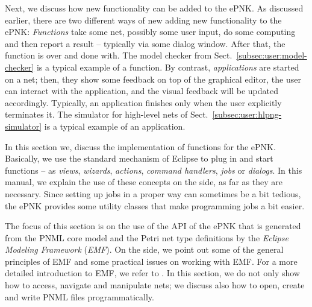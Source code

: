 Next, we discuss how new functionality can be added to the ePNK. As discussed
earlier, there are two different ways of new adding new functionality to the
ePNK: \emph{Functions} take some net, possibly some user input, do some computing
and then report a result -- typically via some dialog window. After that, the function
is over and done with. The model checker from
Sect.~\ref{subsec:user:model-checker} is a typical example of a function.
By contrast, \emph{applications}%
are started on a net; then, they show some feedback on top of the graphical
editor, the user can interact with the application, and the visual feedback
will be updated accordingly. Typically, an application finishes only
when the user explicitly terminates it. The simulator for high-level nets
of Sect.~\ref{subsec:user:hlpng-simulator} is a typical example
of an application.

In this section we, discuss the implementation of functions for the
ePNK. Basically, we use the standard mechanism of Eclipse to plug in
and start functions -- as \emph{views},%
\emph{wizards},%
\emph{actions},%
\emph{command handlers},%
\emph{jobs}%
or \emph{dialogs}.%
In this manual, we explain the use of these concepts on the side, as far as they
are necessary. Since setting up jobs in a proper way can sometimes be a bit
tedious, the ePNK provides some utility classes that make programming jobs a
bit easier.

The focus of this section is on the use of the API of the ePNK that is
generated from the PNML core model and the Petri net type definitions
by the \emph{Eclipse Modeling Framework} (\emph{EMF}).%
On the side, we point out some of the general principles of EMF and some
practical issues on working with EMF. For a more detailed introduction
to EMF, we refer to \cite{BSM06}. In this section, we do not only show
how to access, navigate and manipulate nets; we discuss also how
to open, create and write PNML files programmatically.

